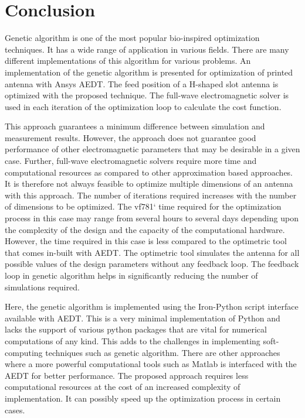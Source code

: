\section{Conclusion}\label{c3sec_concl}
Genetic algorithm is one of the most popular bio-inspired optimization techniques. It has a wide range of application in various fields. There are many different implementations of this algorithm for various problems. An implementation of the genetic algorithm is presented for optimization of printed antenna with Ansys AEDT. The feed position of a H-shaped slot antenna is optimized with the proposed technique. The full-wave electromagnetic solver is used in each iteration of the optimization loop to calculate the cost function.

This approach guarantees a minimum difference between simulation and measurement results. However, the approach does not guarantee good performance of other electromagnetic parameters that may be desirable in a given case. Further, full-wave electromagnetic solvers require more time and computational resources as compared to other approximation based approaches. It is therefore not always feasible to optimize multiple dimensions of an antenna with this approach. The number of iterations required increases with the number of dimensions to be optimized. The vf781` time required for the optimization process in this case may range from several hours to several days depending upon the complexity of the design and the capacity of the computational hardware. However, the time required in this case is less compared to the optimetric tool that comes in-built with AEDT. The optimetric tool simulates the antenna for all possible values of the design parameters without any feedback loop. The feedback loop in genetic algorithm helps in significantly reducing the number of simulations required.

Here, the genetic algorithm is implemented using the Iron-Python script interface available with AEDT. This is a very minimal implementation of Python and lacks the support of various python packages that are vital for numerical computations of any kind. This  adds to the challenges in implementing soft-computing techniques such as genetic algorithm. There are other approaches where a more powerful computational tools such as Matlab is interfaced with the AEDT for better performance. The proposed approach requires less computational resources at the cost of an increased complexity of implementation. It can possibly speed up the optimization process in certain cases.

